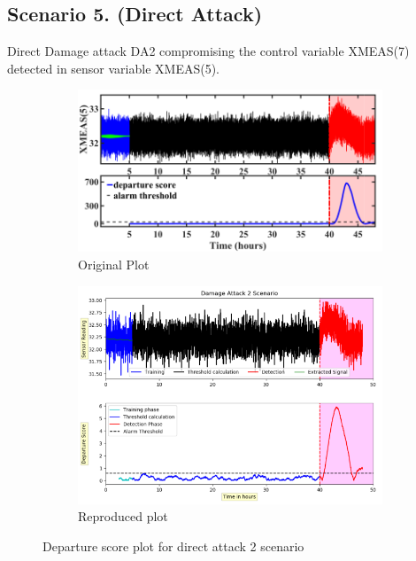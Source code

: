 \subsection*{Scenario 5. (Direct Attack)}

Direct Damage attack DA2 compromising the control variable XMEAS(7) detected in sensor variable XMEAS(5). 

\begin{figure}[H]	
	\centering
	\begin{subfigure}[t]{0.45\textwidth}
		\centering
		\includegraphics[width=\textwidth]{imgs/da2orig.png}
		\caption{Original Plot}\label{fig:1a}		
	\end{subfigure}
	\qquad
	\begin{subfigure}[t]{0.45\textwidth}
		\centering
		\includegraphics[width=\textwidth]{imgs/da2re.png}
		\caption{Reproduced plot}\label{fig:1b}
	\end{subfigure}
	\caption{Departure score plot for direct attack 2 scenario}\label{fig:1}
\end{figure}


